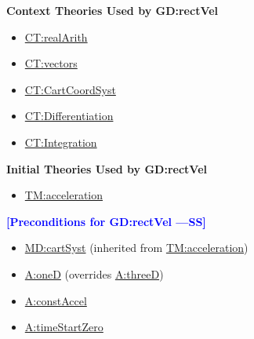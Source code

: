 \documentclass[12pt]{article}
\newcommand{\authornote}[3]{\textcolor{#1}{[#3 ---#2]}}
\newcommand{\authornote}[3]{}
\newcommand{\wss}[1]{\authornote{blue}{SS}{#1}}
\begin{document}
\noindent \textbf{Context Theories Used by GD:rectVel}

\begin{itemize}
\item \hyperref[CT:realArith]{CT:realArith}
\item \hyperref[CT:vectors]{CT:vectors}
\item \hyperref[CT:CartCoordSyst]{CT:CartCoordSyst}
\item \hyperref[CT:Differentiation]{CT:Differentiation}
\item \hyperref[CT:Integration]{CT:Integration}
\end{itemize}

\noindent \textbf{Initial Theories Used by GD:rectVel}

\begin{itemize}
\item \hyperref[TM:acceleration]{TM:acceleration}
\end{itemize}

\noindent \textbf{\wss{Preconditions for GD:rectVel}}

\begin{itemize}
\item \hyperref[MD:cartSyst]{MD:cartSyst} (inherited from \hyperref[TM:acceleration]{TM:acceleration})
\item \hyperref[oneD]{A:oneD} (overrides \hyperref[threeD]{A:threeD})
\item \hyperref[constAccel]{A:constAccel}
\item \hyperref[timeStartZero]{A:timeStartZero}
\end{itemize}
\end{document}
